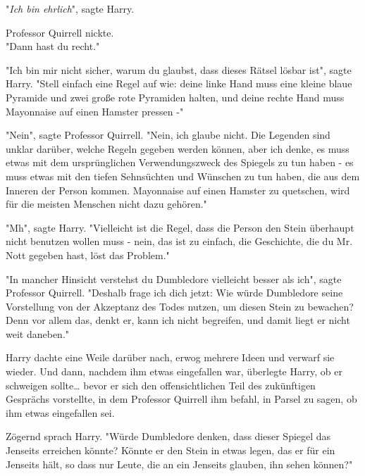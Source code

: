 {"\emph{Ich bin ehrlich}", sagte Harry.

Professor Quirrell nickte.\\ "Dann hast du recht."

"Ich bin mir nicht sicher, warum du glaubst, dass dieses Rätsel lösbar ist", sagte Harry. "Stell einfach eine Regel auf wie: deine linke Hand muss eine kleine blaue Pyramide und zwei große rote Pyramiden halten, und deine rechte Hand muss Mayonnaise auf einen Hamster pressen -"

"Nein", sagte Professor Quirrell. "Nein, ich glaube nicht. Die Legenden sind unklar darüber, welche Regeln gegeben werden können, aber ich denke, es muss etwas mit dem ursprünglichen Verwendungszweck des Spiegels zu tun haben - es muss etwas mit den tiefen Sehnsüchten und Wünschen zu tun haben, die aus dem\\ Inneren der Person kommen. Mayonnaise auf einen Hamster zu quetschen, wird für die meisten Menschen nicht dazu gehören."

"Mh", sagte Harry. "Vielleicht ist die Regel, dass die Person den Stein überhaupt nicht benutzen wollen muss - nein, das ist zu einfach, die Geschichte, die du Mr. Nott gegeben hast, löst das Problem."

"In mancher Hinsicht verstehst du Dumbledore vielleicht besser als ich", sagte Professor Quirrell. "Deshalb frage ich dich jetzt: Wie würde Dumbledore seine Vorstellung von der Akzeptanz des Todes nutzen, um diesen Stein zu bewachen?\\ Denn vor allem das, denkt er, kann ich nicht begreifen, und damit liegt er nicht weit daneben."

Harry dachte eine Weile darüber nach, erwog mehrere Ideen und verwarf sie wieder. Und dann, nachdem ihm etwas eingefallen war, überlegte Harry, ob er schweigen sollte… bevor er sich den offensichtlichen Teil des zukünftigen Gesprächs vorstellte, in dem Professor Quirrell ihm befahl, in Parsel zu sagen, ob ihm etwas eingefallen sei.

Zögernd sprach Harry. "Würde Dumbledore denken, dass dieser Spiegel das Jenseits erreichen könnte? Könnte er den Stein in etwas legen, das er für ein Jenseits hält, so dass nur Leute, die an ein Jenseits glauben, ihn sehen können?"

}

